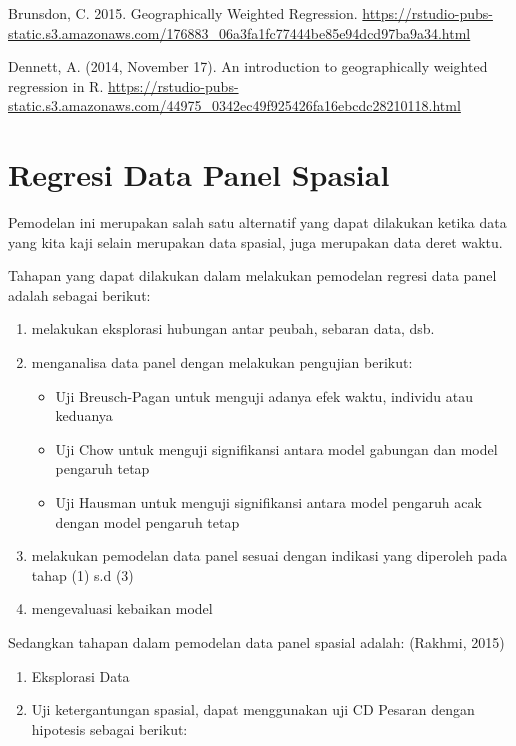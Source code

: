 \documentclass[
]{book}
\begin{document}
Brunsdon, C. 2015. Geographically Weighted Regression. \url{https://rstudio-pubs-static.s3.amazonaws.com/176883_06a3fa1fc77444be85e94dcd97ba9a34.html}

Dennett, A. (2014, November 17). An introduction to geographically weighted regression in R. \url{https://rstudio-pubs-static.s3.amazonaws.com/44975_0342ec49f925426fa16ebcdc28210118.html}

\hypertarget{regresi-data-panel-spasial}{%
\chapter{Regresi Data Panel Spasial}\label{regresi-data-panel-spasial}}

Pemodelan ini merupakan salah satu alternatif yang dapat dilakukan ketika data yang kita kaji selain merupakan data spasial, juga merupakan data deret waktu.

Tahapan yang dapat dilakukan dalam melakukan pemodelan regresi data panel adalah sebagai berikut:

\begin{enumerate}
\def\labelenumi{(\arabic{enumi})}
\item
  melakukan eksplorasi hubungan antar peubah, sebaran data, dsb.
\item
  menganalisa data panel dengan melakukan pengujian berikut:

  \begin{itemize}
  \item
    Uji Breusch-Pagan untuk menguji adanya efek waktu, individu atau keduanya
  \item
    Uji Chow untuk menguji signifikansi antara model gabungan dan model pengaruh tetap
  \item
    Uji Hausman untuk menguji signifikansi antara model pengaruh acak dengan model pengaruh tetap
  \end{itemize}
\item
  melakukan pemodelan data panel sesuai dengan indikasi yang diperoleh pada tahap (1) s.d (3)
\item
  mengevaluasi kebaikan model
\end{enumerate}

Sedangkan tahapan dalam pemodelan data panel spasial adalah: (Rakhmi, 2015)

\begin{enumerate}
\def\labelenumi{(\arabic{enumi})}
\item
  Eksplorasi Data
\item
  Uji ketergantungan spasial, dapat menggunakan uji CD Pesaran dengan hipotesis sebagai berikut:
\end{enumerate}
\end{document}
